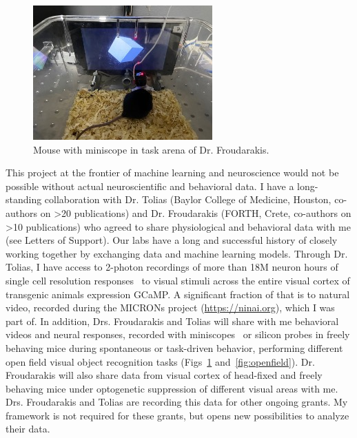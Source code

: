 \documentclass[B2,COG]{ercgrant}
\begin{document}
\begin{figure}
\vspace{-1.8ex}
\includegraphics[width=\linewidth,trim=25 15 10 30, clip]{figures/miniscope.jpg}
\caption{Mouse with miniscope in task arena of Dr. Froudarakis.}
\label{fig:miniscope}
\end{figure}
This project at the frontier of machine learning and neuroscience would not be possible without actual neuroscientific and behavioral data. 
I have a long-standing collaboration with Dr. Tolias (Baylor College of Medicine, Houston, co-authors on >20  publications) and Dr. Froudarakis (FORTH, Crete, co-authors on >10 publications) who agreed to share physiological and behavioral data with me (see Letters of Support).
Our labs have a long and successful history of closely working together by exchanging data and machine learning models. 
Through Dr. Tolias, I have access to 2-photon recordings of more than 18M neuron hours of single cell resolution responses~\parencite{Sofroniew2016-xg} to visual stimuli across the entire visual cortex of transgenic animals expression GCaMP. A significant fraction of that is to natural video, recorded during the MICRONs project (\url{https://ninai.org}), which I was part of.
In addition, Drs. Froudarakis and Tolias will share with me behavioral videos and neural responses, recorded with miniscopes~\parencite[Fig~\ref{fig:miniscope}]{Cai2016-rh} or silicon probes in freely behaving mice during spontaneous or task-driven behavior, performing different open field visual object recognition tasks (Figs~\ref{fig:miniscope} and~\ref{fig:openfield}). Dr. Froudarakis will also share data from visual cortex of head-fixed and freely behaving mice under optogenetic suppression of different visual areas with me. Drs. Froudarakis and Tolias are recording this data for other ongoing grants. My framework is not required for these grants, but opens new possibilities to analyze their data.
\end{document}
